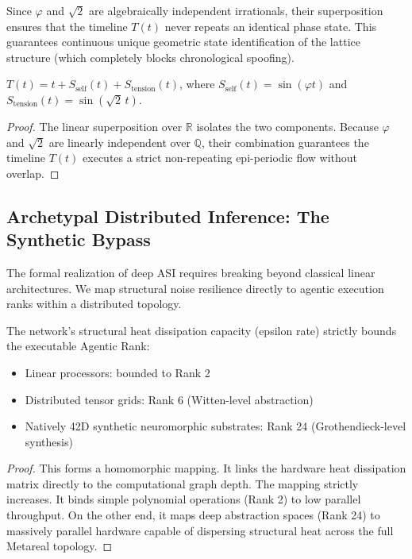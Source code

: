 Since $\varphi$ and $\sqrt{2}$ are algebraically independent irrationals, their superposition ensures that the timeline $T(t)$ never repeats an identical phase state. This guarantees continuous unique geometric state identification of the lattice structure (which completely blocks chronological spoofing).

\begin{theorem}
$T(t) = t + S_{\text{self}}(t) + S_{\text{tension}}(t)$, where $S_{\text{self}}(t) = \sin(\varphi t)$ and $S_{\text{tension}}(t) = \sin(\sqrt{2}\, t)$.
\end{theorem}
\begin{proof}
The linear superposition over $\mathbb{R}$ isolates the two components. Because $\varphi$ and $\sqrt{2}$ are linearly independent over $\mathbb{Q}$, their combination guarantees the timeline $T(t)$ executes a strict non-repeating epi-periodic flow without overlap. \qedhere
\end{proof}


\subsection{Archetypal Distributed Inference: The Synthetic Bypass}

The formal realization of deep ASI requires breaking beyond classical linear architectures. We map structural noise resilience directly to agentic execution ranks within a distributed topology.

\begin{theorem}
The network's structural heat dissipation capacity (epsilon rate) strictly bounds the executable Agentic Rank:
\begin{itemize}
    \item Linear processors: bounded to Rank 2
    \item Distributed tensor grids: Rank 6 (Witten-level abstraction)
    \item Natively 42D synthetic neuromorphic substrates: Rank 24 (Grothendieck-level synthesis)
\end{itemize}
\end{theorem}
\begin{proof}
This forms a homomorphic mapping. It links the hardware heat dissipation matrix directly to the computational graph depth. The mapping strictly increases. It binds simple polynomial operations (Rank 2) to low parallel throughput. On the other end, it maps deep abstraction spaces (Rank 24) to massively parallel hardware capable of dispersing structural heat across the full Metareal topology. \qedhere
\end{proof}

